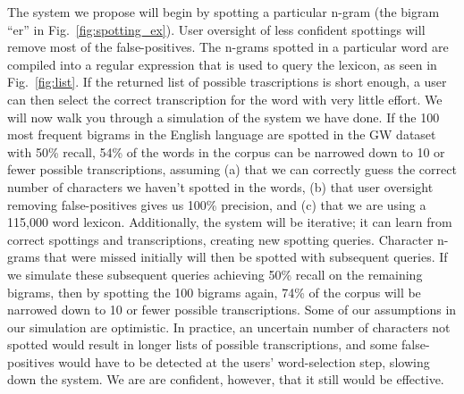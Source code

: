 \documentclass[conference]{IEEEtran}
\begin{document}

The system we propose will begin by spotting a particular n-gram (the bigram ``er'' in Fig.~\ref{fig:spotting_ex}). 
User oversight of less confident spottings will remove most of the false-positives. 
The n-grams spotted in a particular word are compiled into a regular expression that is used to query the lexicon, as seen in Fig.~\ref{fig:list}. 
If the returned list of possible trascriptions is short enough, a user can then select the correct transcription for the word with very little effort. 
We will now walk you through a simulation of the system we have done.
If the 100 most frequent bigrams in the English language are spotted in the GW dataset with 50\% recall, 54\% of the words in the corpus can be narrowed down to 10 or fewer possible transcriptions, assuming (a) that we can correctly guess the correct number of characters we haven't spotted in the words, (b) that user oversight removing false-positives gives us 100\% precision, and (c) that we are using a 115,000 word lexicon. 
Additionally, the system will be iterative; it can learn from correct spottings and transcriptions, creating new spotting queries. Character n-grams that were missed initially will then be spotted with subsequent queries. 
If we simulate these subsequent queries achieving 50\% recall on the remaining bigrams, then by spotting the 100 bigrams again, 74\% of the corpus will be narrowed down to 10 or fewer possible transcriptions.
Some of our assumptions in our simulation are optimistic. In practice, an uncertain number of characters not spotted would result in longer lists of possible transcriptions, and some false-positives would have to be detected at the users' word-selection step, slowing down the system. We are are confident, however, that it still would be effective.
\end{document}
